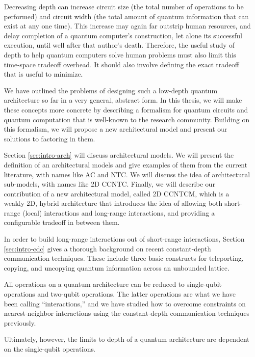 Decreasing depth can increase circuit size (the total number of operations to be performed) and circuit width
(the total amount of quantum information that can exist at any one time). This increase may again far
outstrip human resources, and delay completion of a quantum computer's construction, let alone its
successful execution, until well after that author's death. Therefore, the useful study of depth to help
quantum computers solve human problems must also limit this time-space tradeoff overhead. It should also
involve defining the exact tradeoff that is useful to minimize.

We have outlined the problems of designing such a low-depth quantum architecture so far in a very general,
abstract form. In this thesis, we will make these concepts more concrete by describing a formalism for
quantum circuits and quantum computation that is well-known to the research community.
Building on this formalism, we will propose a new architectural model and present our solutions to factoring in them.


Section \ref{sec:intro-arch} will discuss architectural models. We will present the definition of an
architectural models and give examples of them from the
current literature, with names like \textsf{AC} and \textsf{NTC}. We will discuss the idea of architectural
sub-models, with names like \textsf{2D CCNTC}. Finally,
we will describe our contribution of a new architectural model, called \textsf{2D CCNTCM}, which is a weakly 2D,
hybrid architecture that introduces the idea of allowing both short-range (local) interactions and long-range
interactions, and providing a configurable tradeoff in between them.

In order to build long-range interactions out of short-range interactions, Section \ref{sec:intro-cdc} 
gives a thorough background on recent constant-depth communication techniques. These include three
basic constructs for teleporting, copying, and uncopying quantum information across an unbounded
lattice.

All operations on a quantum architecture can be reduced to single-qubit operations and two-qubit operations.
The latter operations are what we have been calling ``interactions,'' and we have studied how to overcome
constraints on nearest-neighbor interactions using the constant-depth communication techniques previously.

Ultimately, however, the limits to depth of a quantum architecture are dependent on the single-qubit operations.






